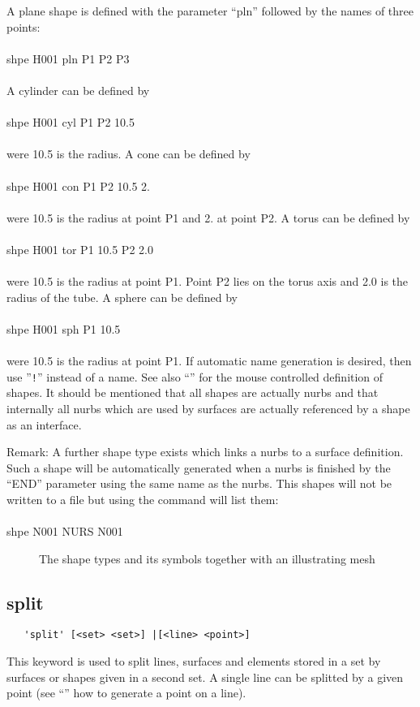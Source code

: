 \documentclass{article}
\begin{document}
A plane shape is defined with the parameter ``pln'' followed by the names of three points:\\\\shpe H001 pln P1 P2 P3\\\\A cylinder can be defined by\\\\shpe H001 cyl P1 P2 10.5\\\\were 10.5 is the radius. A cone can be defined by\\\\shpe H001 con P1 P2 10.5 2.\\\\were 10.5 is the radius at point P1 and 2. at point P2. A torus can be defined by\\\\shpe H001 tor P1 10.5 P2 2.0\\\\were 10.5 is the radius at point P1. Point P2 lies on the torus axis and 2.0 is the radius of the tube. A sphere can be defined by\\\\shpe H001 sph P1 10.5\\\\were 10.5 is the radius at point P1. If automatic name generation is desired, then use ''\verb_!_'' instead of a name. See also ``'' for the mouse controlled definition of shapes. It should be mentioned that all shapes are actually nurbs and that internally all nurbs which are used by surfaces are actually referenced by a shape as an interface.

Remark: A further shape type exists which links a nurbs to a surface definition. Such a shape will be automatically generated when a nurbs is finished by the ``END'' parameter using the same name as the nurbs. This shapes will not be written to a file but using the  command will list them:\\\\shpe N001 NURS N001

\begin{figure}[h]
\caption{\label{The shape types and its symbols together with an illustrating mesh}The shape types and its symbols together with an illustrating mesh}
\end{figure}

\subsection{\label{split}split}
\begin{verbatim}
   'split' [<set> <set>] |[<line> <point>]
\end{verbatim}
This keyword is used to split lines, surfaces and elements stored in a set by surfaces or shapes given in a second set. A single line can be splitted by a given point (see ``'' how to generate a point on a line).
\end{document}
